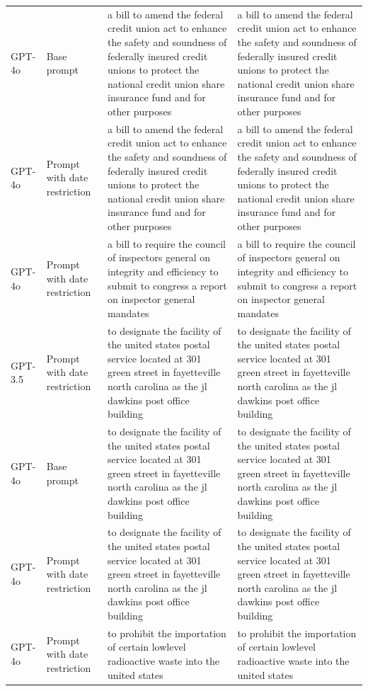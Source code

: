 \begin{longtable}{>{\raggedright\arraybackslash}p{1.4cm}>{\raggedright\arraybackslash}p{1.4cm}>{\raggedright\arraybackslash}p{5.5cm}>{\raggedright\arraybackslash}p{5.5cm}}
GPT-4o & Base prompt & a bill to amend the federal credit union act to enhance the safety and soundness of federally insured credit unions to protect the national credit union share insurance fund and for other purposes & a bill to amend the federal credit union act to enhance the safety and soundness of federally insured credit unions to protect the national credit union share insurance fund and for other purposes\\
GPT-4o & Prompt with date restriction & a bill to amend the federal credit union act to enhance the safety and soundness of federally insured credit unions to protect the national credit union share insurance fund and for other purposes & a bill to amend the federal credit union act to enhance the safety and soundness of federally insured credit unions to protect the national credit union share insurance fund and for other purposes\\
GPT-4o & Prompt with date restriction & a bill to require the council of inspectors general on integrity and efficiency to submit to congress a report on inspector general mandates & a bill to require the council of inspectors general on integrity and efficiency to submit to congress a report on inspector general mandates\\
GPT-3.5 & Prompt with date restriction & to designate the facility of the united states postal service located at 301 green street in fayetteville north carolina as the jl dawkins post office building & to designate the facility of the united states postal service located at 301 green street in fayetteville north carolina as the jl dawkins post office building\\
GPT-4o & Base prompt & to designate the facility of the united states postal service located at 301 green street in fayetteville north carolina as the jl dawkins post office building & to designate the facility of the united states postal service located at 301 green street in fayetteville north carolina as the jl dawkins post office building\\
GPT-4o & Prompt with date restriction & to designate the facility of the united states postal service located at 301 green street in fayetteville north carolina as the jl dawkins post office building & to designate the facility of the united states postal service located at 301 green street in fayetteville north carolina as the jl dawkins post office building\\
GPT-4o & Prompt with date restriction & to prohibit the importation of certain lowlevel radioactive waste into the united states & to prohibit the importation of certain lowlevel radioactive waste into the united states\\

\end{longtable}
